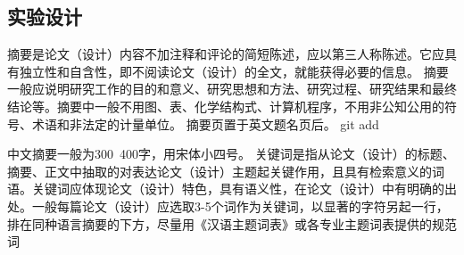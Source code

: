 \documentclass{document}
\begin{document}
\subsection{实验设计}
摘要是论文（设计）内容不加注释和评论的简短陈述，应以第三人称陈述。它应具有独立性和自含性，即不阅读论文（设计）的全文，就能获得必要的信息。
摘要一般应说明研究工作的目的和意义、研究思想和方法、研究过程、研究结果和最终结论等。摘要中一般不用图、表、化学结构式、计算机程序，不用非公知公用的符号、术语和非法定的计量单位。
摘要页置于英文题名页后。   git add

中文摘要一般为300~400字，用宋体小四号。 
关键词是指从论文（设计）的标题、摘要、正文中抽取的对表达论文（设计）主题起关键作用，且具有检索意义的词语。关键词应体现论文（设计）特色，具有语义性，在论文（设计）中有明确的出处。一般每篇论文（设计）应选取3-5个词作为关键词，以显著的字符另起一行，排在同种语言摘要的下方，尽量用《汉语主题词表》或各专业主题词表提供的规范词

\clearpage
\printbibliography
\end{document}
